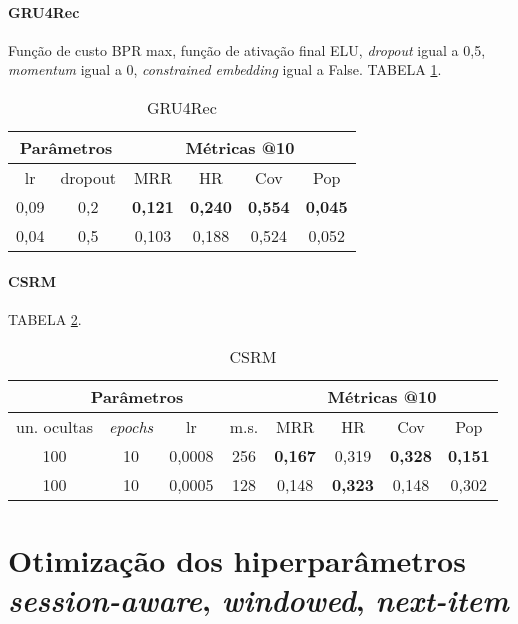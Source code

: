 \subsubsection{GRU4Rec}
Função de custo BPR max, função de ativação final ELU, \textit{dropout} igual a 0,5,
\textit{momentum} igual a 0, \textit{constrained embedding} igual a False. TABELA \ref{app:gru4rec2}.
\begin{table}
  \small
  \centering
  \begin{tabular}{|c|c|c|c|c|c|}
    \hline
      \multicolumn{2}{|c|}{Parâmetros} & \multicolumn{4}{c|}{Métricas @10} \\
      \hline
      lr  & dropout & MRR & HR & Cov & Pop \\
      \hline
      0,09  & 0,2 & \textbf{0,121} & \textbf{0,240} & \textbf{0,554} & \textbf{0,045} \\
      \hline
      0,04  & 0,5 & 0,103 & 0,188 & 0,524 & 0,052 \\
      \hline
    \end{tabular} \label{app:gru4rec2}
    \caption{GRU4Rec}
\end{table}



\subsubsection{CSRM} TABELA \ref{app:csrm2}.
\begin{table}
  \small
  \centering
  \begin{tabular}{|c|c|c|c|c|c|c|c|}
    \hline
      \multicolumn{4}{|c|}{Parâmetros} & \multicolumn{4}{c|}{Métricas @10} \\
      \hline
      un. ocultas & \textit{epochs}  & lr  & m.s. & MRR & HR & Cov & Pop \\
      \hline
      100  & 10 & 0,0008 & 256 & \textbf{0,167} & 0,319 & \textbf{0,328} & \textbf{0,151} \\
      \hline
      100  & 10 & 0,0005 & 128 & 0,148 & \textbf{0,323} & 0,148 & 0,302 \\
      \hline
    \end{tabular} \label{app:csrm2}
    \caption{CSRM}
\end{table}

\newpage


\chapter{Otimização dos hiperparâmetros \textit{session-aware}, \textit{windowed}, \textit{next-item}}

